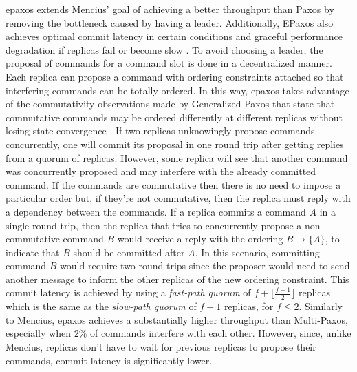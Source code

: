\acrfull{epaxos} extends Mencius' goal of achieving a better throughput than Paxos by removing the bottleneck caused by having a leader. Additionally, EPaxos also achieves optimal commit latency in certain conditions and graceful performance degradation if replicas fail or become slow \cite{Moraru2013}. To avoid choosing a leader, the proposal of commands for a command slot is done in a decentralized manner. Each replica can propose a command with ordering constraints attached so that interfering commands can be totally ordered. In this way, \acrshort{epaxos} takes advantage of the commutativity observations made by Generalized Paxos that state that commutative commands may be ordered differently at different replicas without losing state convergence \cite{Lamport2005}. If two replicas unknowingly propose commands concurrently, one will commit its proposal in one round trip after getting replies from a quorum of replicas. However, some replica will see that another command was concurrently proposed and may interfere with the already committed command. If the commands are commutative then there is no need to impose a particular order but, if they're not commutative, then the replica must reply with a dependency between the commands. If a replica commits a command $A$ in a single round trip, then the replica that tries to concurrently propose a non-commutative command $B$ would receive a reply with the ordering $B \rightarrow \{A\}$, to indicate that $B$ should be committed after $A$. In this scenario, committing command $B$ would require two round trips since the proposer would need to send another message to inform the other replicas of the new ordering constraint. This commit latency is achieved by using a \textit{fast-path quorum} of $f+\lfloor\frac{f+1}{2}\rfloor$ replicas which is the same as the \textit{slow-path quorum} of $f+1$ replicas, for $f \leq 2$. Similarly to Mencius, \acrshort{epaxos} achieves a substantially higher throughput than Multi-Paxos, especially when $2\%$ of commands interfere with each other. However, since, unlike Mencius, replicas don't have to wait for previous replicas to propose their commands, commit latency is significantly lower.\par

